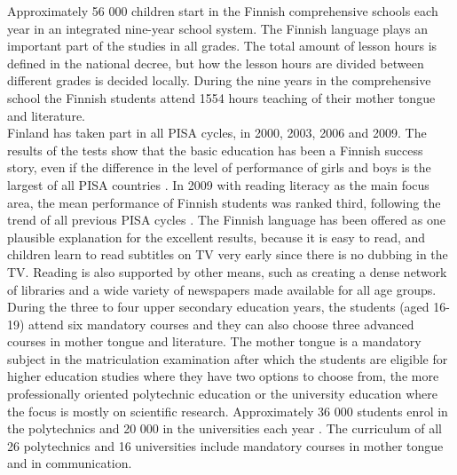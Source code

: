 \begin{multicols}{2}
Approximately 56 000 children start in the Finnish comprehensive schools each
year in an integrated nine-year school system. The Finnish language plays an
important part of the studies in all grades. The total amount of lesson hours
is defined in the national decree, but how the lesson hours are divided between
different grades is decided locally. During the nine years in the comprehensive
school the Finnish students attend 1554 hours teaching of their mother tongue
and literature.\\
Finland has taken part in all PISA cycles, in 2000, 2003, 2006 and
2009. 
The results of the tests show that the basic education has been
a Finnish success story, even if the difference in the level of
performance of girls and boys is the largest of all PISA countries
\cite{Literacy}. In 2009 with reading literacy as the main focus area,
the mean performance of Finnish students was ranked third, following
the trend of all previous PISA cycles \cite{Pisa2006}. 
The Finnish
language has been offered as one plausible explanation for the
excellent results, because it is easy to read, and children learn to
read subtitles on TV very early since there is no dubbing in the
TV. Reading is also supported by other means, such as creating a dense network of
libraries and a wide variety of newspapers made available for all age
groups.\\
During the three to four upper secondary education years, the
students (aged 16-19) attend six mandatory courses and they can also
choose three advanced courses in mother tongue and literature. The
mother tongue is a mandatory subject in the matriculation examination
after which the students are eligible for higher education studies
where they have two options to choose from, the more professionally
oriented polytechnic education or the university education where the
focus is mostly on scientific research. Approximately 36 000 students
enrol in the polytechnics and 20 000 in the universities each year
\cite{Education}. The curriculum of all 26 polytechnics and 16
universities include mandatory courses in mother tongue and in
communication.


\end{multicols}
